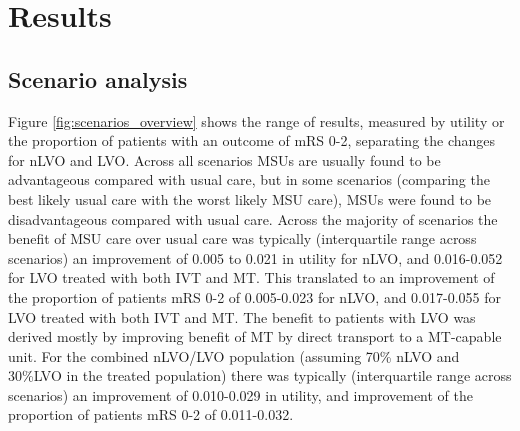 \section{Results}

\subsection{Scenario analysis}

Figure \ref{fig:scenarios_overview} shows the range of results, measured by utility or the proportion of patients with an outcome of mRS 0-2, separating the changes for nLVO and LVO. Across all scenarios MSUs are usually found to be advantageous compared with usual care, but in some scenarios (comparing the best likely usual care with the worst likely MSU care), MSUs were found to be disadvantageous compared with usual care. Across the majority of scenarios the benefit of MSU care over usual care was typically (interquartile range across scenarios) an improvement of 0.005 to 0.021 in utility for nLVO, and 0.016-0.052 for LVO treated with both IVT and MT. This translated to an improvement of the proportion of patients mRS 0-2 of 0.005-0.023 for nLVO, and 0.017-0.055 for LVO treated with both IVT and MT. The benefit to patients with LVO was derived mostly by improving benefit of MT by direct transport to a MT-capable unit. For the combined nLVO/LVO population (assuming 70\% nLVO and 30\%LVO in the treated population) there was typically (interquartile range across scenarios) an improvement of 0.010-0.029 in utility, and improvement of the proportion of patients mRS 0-2 of 0.011-0.032.



